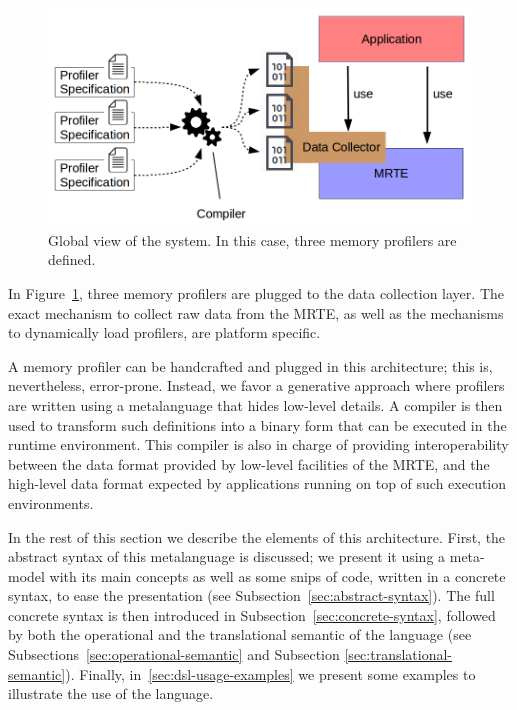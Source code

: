 \begin{figure}[!ht]
\centering
\includegraphics[scale=0.4]{./chapter6/fig/global-view.png}
\caption{Global view of the system. In this case, three memory profilers are defined.}\label{fig:dsl-global-view}
\end{figure}

In Figure~\ref{fig:dsl-global-view}, three memory profilers are plugged to the data collection layer.
The exact mechanism to collect raw data from the MRTE, as well as the mechanisms to dynamically load profilers, are platform specific.

A memory profiler can be handcrafted and plugged in this architecture; this is, nevertheless, error-prone.
Instead, we favor a generative approach where profilers are written using a metalanguage that hides low-level details.
A compiler is then used to transform such definitions into a binary form that can be executed in the runtime environment.
This compiler is also in charge of providing interoperability between the data format provided by low-level facilities of the MRTE, and the high-level data format expected by applications running on top of such execution environments. 

In the rest of this section we describe the elements of this architecture.
First, the abstract syntax of this metalanguage is discussed; we present it using a meta-model with its main concepts as well as some snips of code, written in a concrete syntax, to ease the presentation (see Subsection~\ref{sec:abstract-syntax}).
The full concrete syntax is then introduced in Subsection~\ref{sec:concrete-syntax}, followed by 
\ifoperationalSemanticsOn
both the operational and
\else
the
\fi
translational semantic of the language (see 
\ifoperationalSemanticsOn
Subsections~\ref{sec:operational-semantic} and
\else
Subsection
\fi
\ref{sec:translational-semantic}).
Finally, in~\ref{sec:dsl-usage-examples} we present some examples to illustrate the use of the language.


